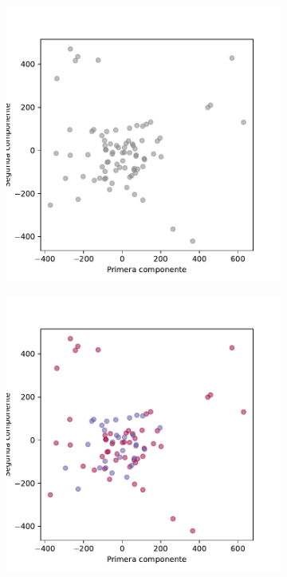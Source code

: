 \begin{figure}[p]
  \centering
  \begin{subfigure}{0.45\textwidth}
    \centering
    \includegraphics[width=\textwidth]{figures/pca-all-sessions-trayectory.pdf}
    \caption{}
    \label{fig:treat-pca}
  \end{subfigure}
  \begin{subfigure}{0.45\textwidth}
    \centering
    \includegraphics[width=\textwidth]{figures/true_asg-all-sessions-trayectory.pdf}

\end{subfigure}
\end{figure}

